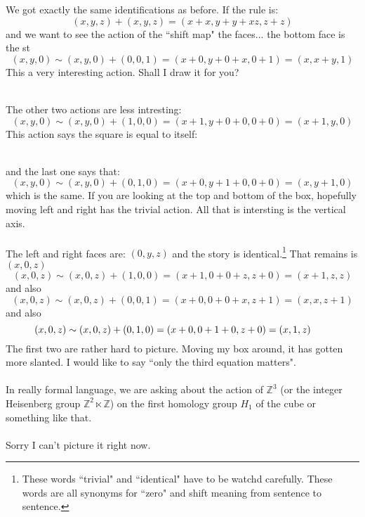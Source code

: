 \documentclass[12pt]{article}
\begin{document}
\noindent We got exactly the same identifications as before.  If the rule is:
$$ (x,y,z) + (x,y,z) = (x+x, y+y+xz , z + z) $$
and we want to see the action of the ``shift map" the faces... the bottom face is the st
$$ (x,y,0) \sim (x,y,0) + (0,0,1) = (x+0, y+0+x, 0+1) = (x,x+y,1) $$
This a very interesting action.  Shall I draw it for you? \\
 \\
The other two actions are less intresting:
$$ (x,y,0) \sim (x,y,0) + (1,0,0) = (x+1, y+0+0, 0+0) = (x+1,y,0) $$
This action says the square is equal to itself:\\
 \\
and the last one says that:
$$ (x,y,0) \sim (x,y,0) + (0,1,0) = (x+0, y+1+0, 0+0) = (x,y+1,0) $$
which is the same.  If you are looking at the top and bottom of the box, hopefully moving left and right has the trivial action. All that is intersting is the vertical axis. \\ \\
The left and right faces are: $(0,y,z)$ and the story is identical.\footnote{These words ``trivial" and ``identical" have to be watchd carefully.  These words are all synonyms for ``zero" and shift meaning from sentence to sentence.  }  That remains is $(x,0,z)$ 
$$ (x,0,z) \sim (x,0,z) + (1,0,0) = (x+1, 0 + 0 + z, z + 0)= (x+1,z,z) $$
and also 
$$ (x,0,z) \sim (x,0,z) + (0,0,1) = (x+0, 0 + 0 + x, z + 1)= (x,x,z+1) $$
and also
$$ (x,0,z) \sim (x,0,z) + (0,1,0) = (x+0, 0+1+0, z + 0)= (x,1,z) \hspace{0.27in} $$
The first two are rather hard to picture.  Moving my box around, it has gotten more slanted.  I would like to say ``only the third equation matters".   \\ \\
In really formal language, we are asking about the action of $\mathbb{Z}^3$ (or the integer Heisenberg group $\mathbb{Z}^2 \ltimes \mathbb{Z} $) on the first homology group $H_1$ of the cube or something like that. \\ \\
Sorry I can't picture it right now. 
\end{document}
